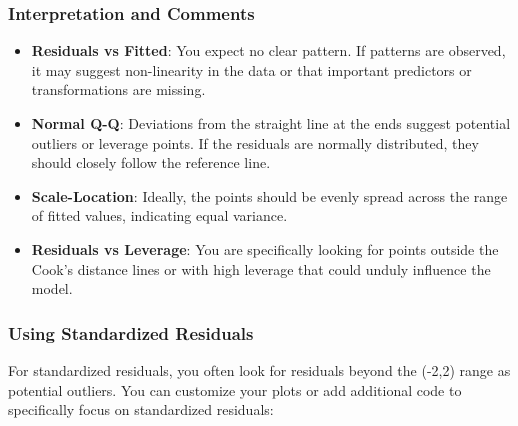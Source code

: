 \documentclass[
]{article}
\newenvironment{Shaded}{\begin{snugshade}}{\end{snugshade}}
\newcommand{\AttributeTok}[1]{\textcolor[rgb]{0.13,0.29,0.53}{#1}}
\newcommand{\CommentTok}[1]{\textcolor[rgb]{0.56,0.35,0.01}{\textit{#1}}}
\newcommand{\DecValTok}[1]{\textcolor[rgb]{0.00,0.00,0.81}{#1}}
\newcommand{\FunctionTok}[1]{\textcolor[rgb]{0.13,0.29,0.53}{\textbf{#1}}}
\newcommand{\NormalTok}[1]{#1}
\newcommand{\OtherTok}[1]{\textcolor[rgb]{0.56,0.35,0.01}{#1}}
\newcommand{\SpecialCharTok}[1]{\textcolor[rgb]{0.81,0.36,0.00}{\textbf{#1}}}
\newcommand{\StringTok}[1]{\textcolor[rgb]{0.31,0.60,0.02}{#1}}
\providecommand{\tightlist}{%
  \setlength{\itemsep}{0pt}\setlength{\parskip}{0pt}}
\begin{document}
\hypertarget{interpretation-and-comments}{%
\subsubsection{Interpretation and
Comments}\label{interpretation-and-comments}}

\begin{itemize}
\tightlist
\item
  \textbf{Residuals vs Fitted}: You expect no clear pattern. If patterns
  are observed, it may suggest non-linearity in the data or that
  important predictors or transformations are missing.
\item
  \textbf{Normal Q-Q}: Deviations from the straight line at the ends
  suggest potential outliers or leverage points. If the residuals are
  normally distributed, they should closely follow the reference line.
\item
  \textbf{Scale-Location}: Ideally, the points should be evenly spread
  across the range of fitted values, indicating equal variance.
\item
  \textbf{Residuals vs Leverage}: You are specifically looking for
  points outside the Cook's distance lines or with high leverage that
  could unduly influence the model.
\end{itemize}

\hypertarget{using-standardized-residuals}{%
\subsubsection{Using Standardized
Residuals}\label{using-standardized-residuals}}

For standardized residuals, you often look for residuals beyond the
(-2,2) range as potential outliers. You can customize your plots or add
additional code to specifically focus on standardized residuals:

\begin{Shaded}
\end{Shaded}
\end{document}
